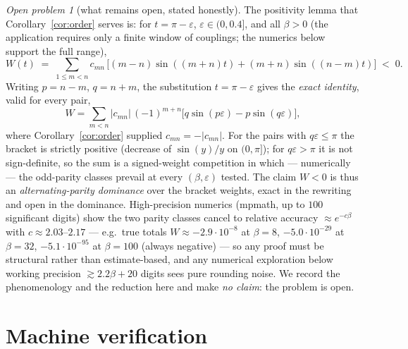 \documentclass[11pt]{article}
\theoremstyle{remark}
\newtheorem{problem}[theorem]{Open problem}
\begin{document}
\begin{problem}[what remains open, stated honestly]
\label{prob:open}
The positivity lemma that Corollary~\ref{cor:order} serves is: for
$t = \pi - \varepsilon$, $\varepsilon \in (0, 0.4]$, and all
$\beta > 0$ (the application requires only a finite window of
couplings; the numerics below support the full range),
\[
W(t) \;=\; \sum_{1 \le m < n} c_{mn}\,
\bigl[(m-n)\sin((m+n)t) + (m+n)\sin((n-m)t)\bigr] \;<\; 0 .
\]
Writing $p = n-m$, $q = n+m$, the substitution $t = \pi -
\varepsilon$ gives the \emph{exact identity}, valid for every pair,
\[
W = \sum_{m<n} |c_{mn}|\,(-1)^{m+n}
\bigl[q\sin(p\varepsilon) - p\sin(q\varepsilon)\bigr],
\]
where Corollary~\ref{cor:order} supplied $c_{mn} = -|c_{mn}|$. For
the pairs with $q\varepsilon \le \pi$ the bracket is strictly
positive (decrease of $\sin(y)/y$ on $(0,\pi]$); for
$q\varepsilon > \pi$ it is not sign-definite, so the sum is a
signed-weight competition in which --- numerically --- the
odd-parity classes prevail at every $(\beta, \varepsilon)$ tested.
The claim $W<0$ is thus an \emph{alternating-parity dominance} over
the bracket weights, exact in the rewriting and open in the
dominance. High-precision
numerics (mpmath, up to $100$ significant digits) show the two parity
classes cancel to relative accuracy $\approx e^{-c\beta}$ with
$c \approx 2.03$--$2.17$ --- e.g.\ true totals
$W \approx -2.9\cdot10^{-8}$ at $\beta = 8$,
$-5.0\cdot10^{-29}$ at $\beta = 32$,
$-5.1\cdot10^{-95}$ at $\beta = 100$ (always negative) --- so any
proof must be structural rather than estimate-based, and any
numerical exploration below working precision
$\gtrsim 2.2\beta + 20$ digits sees pure rounding noise. We record
the phenomenology and the reduction here and make \emph{no claim}:
the problem is open.
\end{problem}

\section{Machine verification}
\end{document}
